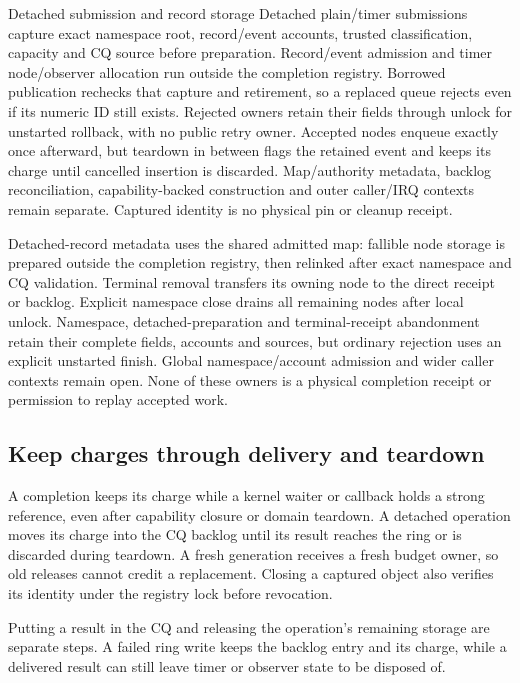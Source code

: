 \begin{implementationdetail}{Detached submission and record storage}
Detached plain/timer submissions capture exact namespace root, record/event
accounts, trusted classification, capacity and CQ source before preparation.
Record/event admission and timer node/observer allocation run outside the
completion registry. Borrowed publication rechecks that capture and retirement, so
a replaced queue rejects even if its numeric ID still exists. Rejected owners
retain their fields through unlock for unstarted rollback, with no public retry
owner. Accepted nodes enqueue exactly once afterward, but teardown in between flags
the retained event and keeps its charge until cancelled insertion is discarded.
Map/authority metadata, backlog reconciliation, capability-backed construction
and outer caller/IRQ contexts remain separate. Captured identity is no physical
pin or cleanup receipt.

Detached-record metadata uses the shared admitted map: fallible node storage is
prepared outside the completion registry, then relinked after exact namespace
and CQ validation. Terminal removal transfers its owning node to the direct
receipt or backlog. Explicit namespace close drains all remaining nodes after
local unlock. Namespace, detached-preparation and terminal-receipt abandonment
retain their complete fields, accounts and sources, but ordinary rejection uses an
explicit unstarted finish. Global namespace/account admission and wider caller
contexts remain open. None of these owners is a physical completion receipt or
permission to replay accepted work.
\end{implementationdetail}

\subsection{Keep charges through delivery and teardown}

A completion keeps its charge while a kernel waiter or callback holds a
strong reference, even after capability closure or domain teardown. A detached
operation moves its charge into the CQ backlog until its result reaches the
ring or is discarded during teardown. A fresh generation receives a fresh
budget owner, so old releases cannot credit a replacement. Closing a captured
object also verifies its identity under the registry lock before revocation.

Putting a result in the CQ and releasing the operation's remaining storage are
separate steps. A failed ring write keeps the backlog entry and its charge, while
a delivered result can still leave timer or observer state to be disposed of.

